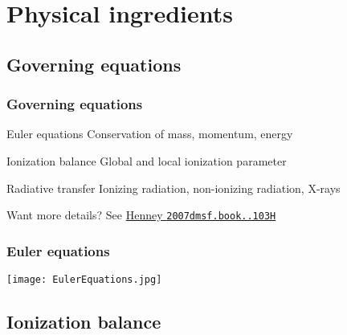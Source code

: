 \documentclass[presentation]{beamer}
\begin{document}
\section{Physical ingredients}

\subsection{Governing equations}
\begin{frame}
  \frametitle{Governing equations}
  \begin{block}{Euler equations}
    Conservation of mass, \alert{momentum}, energy
  \end{block}
  \begin{block}{Ionization balance}
    Global and local ionization parameter
  \end{block}
  \begin{block}{Radiative transfer}
    \alert{Ionizing radiation}, non-ionizing radiation, X-rays
  \end{block}
  \begin{block}{Want more details?}
    See \href{http://adsabs.harvard.edu/abs/2007dmsf.book..103H}{Henney \texttt{2007dmsf.book..103H}}
  \end{block}
\end{frame}



\begin{frame}
  \frametitle{Euler equations}
  \begin{centering}
    \texttt{[image: EulerEquations.jpg]}\par
  \note{
    \[
    \frac{d}{dt} ( \rho \VEC{u} ) + \VEC{\grad} ( P + \rho u^2 ) = \rho \VEC{a} 
    \]
  }
  \end{centering}
\end{frame}

\subsection{Ionization balance}
\end{document}
